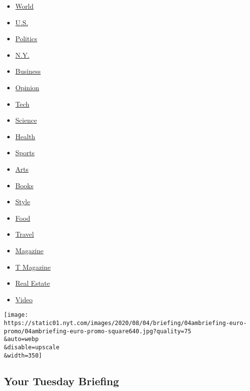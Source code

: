 \begin{itemize}
\tightlist
\item
  \href{https://www.nytimes.com/section/world}{World}
\item
  \href{https://www.nytimes.com/section/us}{U.S.}
\item
  \href{https://www.nytimes.com/section/politics}{Politics}
\item
  \href{https://www.nytimes.com/section/nyregion}{N.Y.}
\item
  \href{https://www.nytimes.com/section/business}{Business}
\item
  \href{https://www.nytimes.com/section/opinion}{Opinion}
\item
  \href{https://www.nytimes.com/section/technology}{Tech}
\item
  \href{https://www.nytimes.com/section/science}{Science}
\item
  \href{https://www.nytimes.com/section/health}{Health}
\item
  \href{https://www.nytimes.com/section/sports}{Sports}
\item
  \href{https://www.nytimes.com/section/arts}{Arts}
\item
  \href{https://www.nytimes.com/section/books}{Books}
\item
  \href{https://www.nytimes.com/section/style}{Style}
\item
  \href{https://www.nytimes.com/section/food}{Food}
\item
  \href{https://www.nytimes.com/section/travel}{Travel}
\item
  \href{https://www.nytimes.com/section/magazine}{Magazine}
\item
  \href{https://www.nytimes.com/section/t-magazine}{T Magazine}
\item
  \href{https://www.nytimes.com/section/realestate}{Real Estate}
\item
  \href{https://www.nytimes.com/video}{Video}
\end{itemize}

\href{/2020/08/03/briefing/tiktok-spain-turkey.html}{}

\texttt{[image: https://static01.nyt.com/images/2020/08/04/briefing/04ambriefing-euro-promo/04ambriefing-euro-promo-square640.jpg?quality=75\\\&auto=webp\\\&disable=upscale\\\&width=350]}

\href{/2020/08/03/briefing/tiktok-spain-turkey.html}{}

\hypertarget{your-tuesday-briefing}{%
\subsection{Your Tuesday Briefing}\label{your-tuesday-briefing}}

